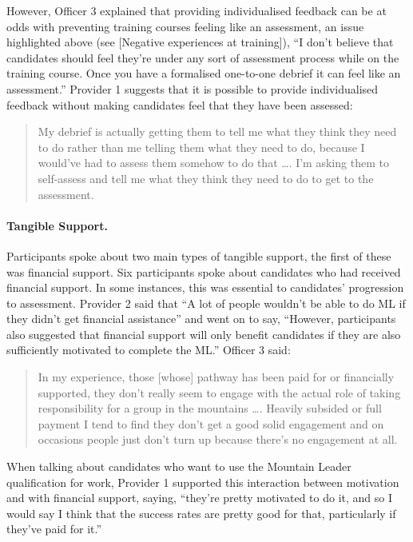 \documentclass[
  12pt,
  a4paper,
]{book}
\begin{document}
However, Officer 3 explained that providing individualised feedback can be at odds with preventing training courses feeling like an assessment, an issue highlighted above (see {[}Negative experiences at training{]}), ``I don't believe that candidates should feel they're under any sort of assessment process while on the training course. Once you have a formalised one-to-one debrief it can feel like an assessment.'' Provider 1 suggests that it is possible to provide individualised feedback without making candidates feel that they have been assessed:

\begin{quote}
My debrief is actually getting them to tell me what they think they need to do rather than me telling them what they need to do, because I would've had to assess them somehow to do that \ldots. I'm asking them to self-assess and tell me what they think they need to do to get to the assessment.
\end{quote}

\hypertarget{tangible-support.}{%
\paragraph{Tangible Support.}\label{tangible-support.}}

Participants spoke about two main types of tangible support, the first of these was financial support. Six participants spoke about candidates who had received financial support. In some instances, this was essential to candidates' progression to assessment. Provider 2 said that ``A lot of people wouldn't be able to do ML if they didn't get financial assistance'' and went on to say, ``However, participants also suggested that financial support will only benefit candidates if they are also sufficiently motivated to complete the ML.'' Officer 3 said:

\begin{quote}
In my experience, those {[}whose{]} pathway has been paid for or financially supported, they don't really seem to engage with the actual role of taking responsibility for a group in the mountains \ldots. Heavily subsided or full payment I tend to find they don't get a good solid engagement and on occasions people just don't turn up because there's no engagement at all.
\end{quote}

When talking about candidates who want to use the Mountain Leader qualification for work, Provider 1 supported this interaction between motivation and with financial support, saying, ``they're pretty motivated to do it, and so I would say I think that the success rates are pretty good for that, particularly if they've paid for it.''
\end{document}
